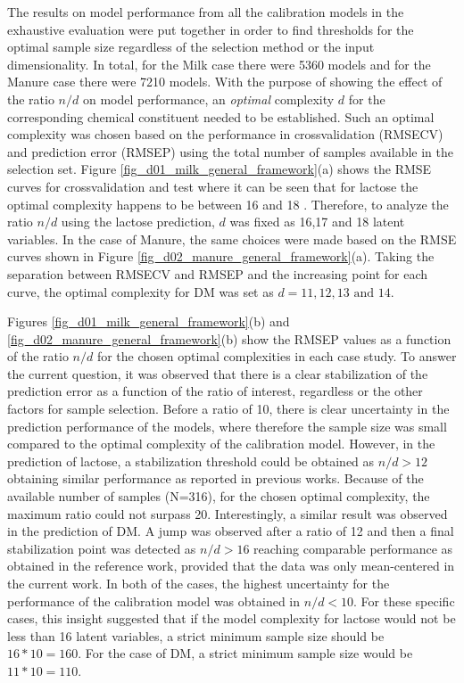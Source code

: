 \documentclass[journal=ancham,manuscript=article]{achemso}
\begin{document}
The results on model performance from all the calibration models in the exhaustive evaluation were put together in order to find thresholds for the optimal sample size regardless of the selection method or the input dimensionality. In total, for the Milk case there were 5360 models and for the Manure case there were 7210 models. With the purpose of showing the effect of the ratio $n/d$ on model performance, an \emph{optimal} complexity $d$ for the corresponding chemical constituent needed to be established. Such an optimal complexity was chosen based on the performance in crossvalidation (RMSECV) and prediction error (RMSEP) using the total number of samples available in the selection set. Figure \ref{fig_d01_milk_general_framework}(a) shows the RMSE curves for crossvalidation and test where it can be seen that for lactose the optimal complexity happens to be between 16 and 18 \cite{Diaz-Olivares2020}. Therefore, to analyze the ratio $n/d$ using the lactose prediction, $d$ was fixed as 16,17 and 18 latent variables. In the case of Manure, the same choices were made based on the RMSE curves shown in Figure \ref{fig_d02_manure_general_framework}(a). Taking the separation between RMSECV and RMSEP and the increasing point for each curve, the optimal complexity for DM was set as $d = 11,12,13 \text{ and } 14$\cite{Saeys2005}. 

Figures \ref{fig_d01_milk_general_framework}(b) and \ref{fig_d02_manure_general_framework}(b) show the RMSEP values as a function of the ratio $n/d$ for the chosen optimal complexities in each case study. To answer the current question, it was observed that there is a clear stabilization of the prediction error as a function of the ratio of interest, regardless or the other factors for sample selection. Before a ratio of 10, there is clear uncertainty in the prediction performance of the models, where therefore the sample size was small compared to the optimal complexity of the calibration model. However, in the prediction of lactose, a stabilization threshold could be obtained as $n/d>12$ obtaining similar performance as reported in previous works\cite{Diaz-Olivares2020, Aernouts2011}. Because of the available number of samples (N=316), for the chosen optimal complexity, the maximum ratio could not surpass 20. Interestingly, a similar result was observed in the prediction of DM. A jump was observed after a ratio of 12 and then a final stabilization point was detected as $n/d>16$ reaching comparable performance as obtained in the reference work, provided that the data was only mean-centered in the current work\cite{Saeys2005}. In both of the cases, the highest uncertainty for the performance of the calibration model was obtained in $n/d<10$. For these specific cases, this insight suggested that if the model complexity for lactose would not be less than 16 latent variables, a strict minimum sample size should be $16*10=160$. For the case of DM, a strict minimum sample size would be $11*10=110$. 
\end{document}
